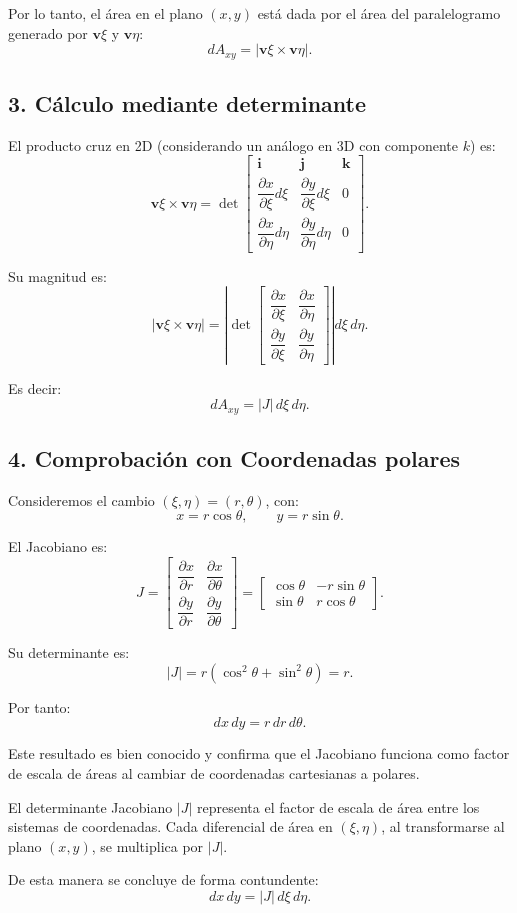 \documentclass[a4paper,11pt]{article}
\begin{document}
Por lo tanto, el área en el plano $(x,y)$ está dada por el área del paralelogramo generado por
$\mathbf{v}\xi$ y $\mathbf{v}\eta$:
\[
dA_{xy} = |\mathbf{v}\xi \times \mathbf{v}\eta|.
\]

\subsection*{3. Cálculo mediante determinante}

El producto cruz en 2D (considerando un análogo en 3D con componente $k$) es:
\[
\mathbf{v}\xi \times \mathbf{v}\eta 
= \det
\begin{bmatrix}
\mathbf{i} & \mathbf{j} & \mathbf{k} \\
\dfrac{\partial x}{\partial \xi} d\xi & \dfrac{\partial y}{\partial \xi} d\xi & 0 \\
\dfrac{\partial x}{\partial \eta} d\eta & \dfrac{\partial y}{\partial \eta} d\eta & 0
\end{bmatrix}.
\]

Su magnitud es:
\[
|\mathbf{v}\xi \times \mathbf{v}\eta|
= \left|
\det\begin{bmatrix}
\dfrac{\partial x}{\partial \xi} & \dfrac{\partial x}{\partial \eta} \\
\dfrac{\partial y}{\partial \xi} & \dfrac{\partial y}{\partial \eta}
\end{bmatrix}
\right| d\xi\, d\eta.
\]

Es decir:
\[
dA_{xy} = |J| \, d\xi\, d\eta.
\]

\subsection*{4. Comprobación con Coordenadas polares}

Consideremos el cambio $(\xi,\eta) = (r,\theta)$, con:
\[
x = r\cos\theta, \qquad y = r\sin\theta.
\]

El Jacobiano es:
\[
J = 
\begin{bmatrix}
\dfrac{\partial x}{\partial r} & \dfrac{\partial x}{\partial \theta} \\[1.2ex]
\dfrac{\partial y}{\partial r} & \dfrac{\partial y}{\partial \theta}
\end{bmatrix}
=
\begin{bmatrix}
\cos\theta & -r\sin\theta \\
\sin\theta & r\cos\theta
\end{bmatrix}.
\]

Su determinante es:
\[
|J| = r(\cos^2\theta + \sin^2\theta) = r.
\]

Por tanto:
\[
dx\,dy = r\, dr\, d\theta.
\]

Este resultado es bien conocido y confirma que el Jacobiano funciona como factor de escala de áreas
al cambiar de coordenadas cartesianas a polares.

El determinante Jacobiano $|J|$ representa el factor de escala de área entre los sistemas de coordenadas.  
Cada diferencial de área en $(\xi,\eta)$, al transformarse al plano $(x,y)$, se multiplica por $|J|$.  

De esta manera se concluye de forma contundente:
\[
\boxed{dx\,dy = |J| \, d\xi\, d\eta.}
\]
\end{document}
